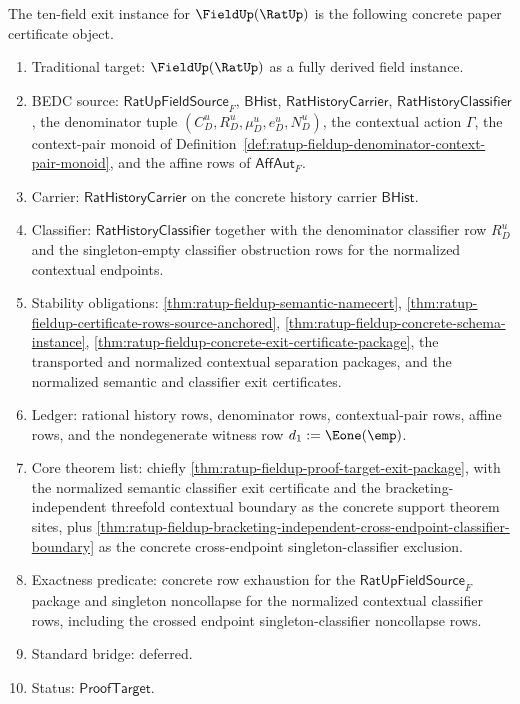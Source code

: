 \begin{definition}
\label{def:ratup-fieldup-ten-field-exit-instance}
The ten-field exit instance for $\FieldUp(\RatUp)$ is the following concrete
paper certificate object.
\begin{enumerate}
  \item Traditional target: $\FieldUp(\RatUp)$ as a fully derived field
  instance.
  \item BEDC source: $\mathsf{RatUpFieldSource}_F$, $\mathsf{BHist}$,
  $\mathsf{RatHistoryCarrier}$, $\mathsf{RatHistoryClassifier}$, the denominator
  tuple $(C_D^u,R_D^u,\mu_D^u,e_D^u,N_D^u)$, the contextual action $\Gamma$,
  the context-pair monoid of
  Definition~\ref{def:ratup-fieldup-denominator-context-pair-monoid}, and the affine
  rows of $\mathsf{AffAut}_F$.
  \item Carrier: $\mathsf{RatHistoryCarrier}$ on the concrete history carrier
  $\mathsf{BHist}$.
  \item Classifier: $\mathsf{RatHistoryClassifier}$ together with the
  denominator classifier row $R_D^u$ and the singleton-empty classifier
  obstruction rows for the normalized contextual endpoints.
  \item Stability obligations:
  \autoref{thm:ratup-fieldup-semantic-namecert},
  \autoref{thm:ratup-fieldup-certificate-rows-source-anchored},
  \autoref{thm:ratup-fieldup-concrete-schema-instance},
  \autoref{thm:ratup-fieldup-concrete-exit-certificate-package}, the transported
  and normalized contextual separation packages, and the normalized semantic and
  classifier exit certificates.
  \item Ledger: rational history rows, denominator rows, contextual-pair rows,
  affine rows, and the nondegenerate witness row $d_1:=\Eone(\emp)$.
  \item Core theorem list: chiefly
  \autoref{thm:ratup-fieldup-proof-target-exit-package}, with the normalized
  semantic classifier exit certificate and the bracketing-independent threefold
  contextual boundary as the concrete support theorem sites, plus
  \autoref{thm:ratup-fieldup-bracketing-independent-cross-endpoint-classifier-boundary}
  as the concrete cross-endpoint singleton-classifier exclusion.
  \item Exactness predicate: concrete row exhaustion for the
  $\mathsf{RatUpFieldSource}_F$ package and singleton noncollapse for the
  normalized contextual classifier rows, including the crossed endpoint
  singleton-classifier noncollapse rows.
  \item Standard bridge: deferred.
  \item Status: $\mathsf{ProofTarget}$.
\end{enumerate}
\end{definition}

